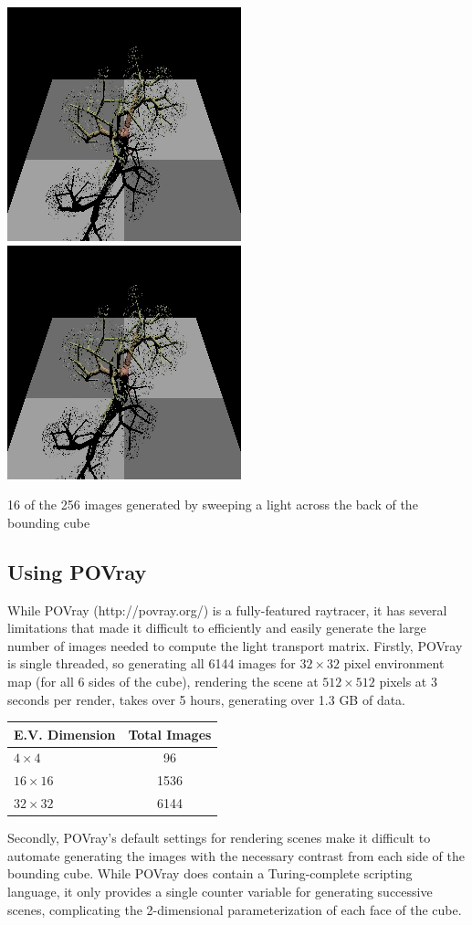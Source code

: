 \documentclass[11pt]{article}
\begin{document}
\begin{table}[htb]
    \includegraphics[width=.2\linewidth]{figs/tree/0014}
    \includegraphics[width=.2\linewidth]{figs/tree/0015}
    \caption{16 of the 256 images generated by sweeping a light across the back of the bounding cube}
\end{table}

\subsection{Using POVray}

While POVray (http://povray.org/) is a fully-featured raytracer, it has several
limitations that made it difficult to efficiently and easily generate the large
number of images needed to compute the light transport matrix. Firstly, POVray
is single threaded, so generating all 6144 images for $32\times 32$ pixel
environment map (for all 6 sides of the cube), rendering the scene at
$512\times 512$ pixels at 3 seconds per render, takes over 5 hours, generating
over 1.3 GB of data.

\begin{center}
\begin{tabular}{|l|c|}
 \hline
 E.V. Dimension & Total Images\\
 \hline
 $4\times 4$ & 96 \\
 $16\times 16$ & 1536 \\
 $32\times 32$ & 6144 \\
 \hline
\end{tabular}
\end{center}

Secondly, POVray's default settings for rendering scenes make it difficult to
automate generating the images with the necessary contrast from each side of
the bounding cube. While POVray does contain a Turing-complete scripting
language, it only provides a single counter variable for generating successive
scenes, complicating the 2-dimensional parameterization of each face of the
cube.
\end{document}

